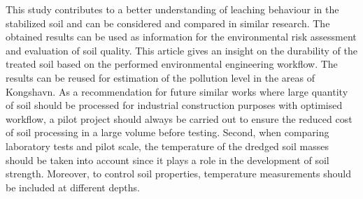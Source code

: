 \documentclass[algorithms,article,accept,pdftex,moreauthors]{Definitions/mdpi}
\begin{document}
{This study contributes to a better understanding of leaching behaviour in the stabilized soil and can be considered and compared in similar research. The obtained results  can be used as information for the environmental risk assessment and evaluation of soil quality. This article gives an insight on the durability of the treated soil based on the performed environmental engineering workflow. The results can be reused for estimation of the pollution level in the areas of Kongshavn.} As a recommendation for future similar works where large quantity of soil should be processed for industrial construction purposes {with optimised} workflow{, }a pilot project should {always }be carried out to ensure {the reduced cost} of soil {processing} in a large volume before {testing}. Second, when comparing laboratory tests and pilot scale, the temperature of the dredged soil masses should be taken into account {since it} plays a role in the development of soil strength. Moreover, to control soil properties, temperature measurements should be included at different depths. 



%



\end{document}
